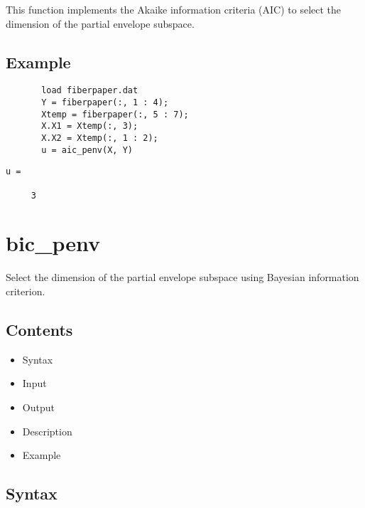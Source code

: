 \documentclass[a4paper,11pt,openany]{memoir}
\begin{document}
\begin{par}
This function implements the Akaike information criteria (AIC) to select the dimension of the partial envelope subspace.
\end{par} \vspace{1em}


\subsection*{Example}


\begin{verbatim}       load fiberpaper.dat
       Y = fiberpaper(:, 1 : 4);
       Xtemp = fiberpaper(:, 5 : 7);
       X.X1 = Xtemp(:, 3);
       X.X2 = Xtemp(:, 1 : 2);
       u = aic_penv(X, Y)\end{verbatim}
    
        \color{lightgray}\ttfamily \begin{verbatim}
u =

     3

\end{verbatim} \rmfamily
\color{black}
    

\newpage

\rmfamily
\color{black}\section{bic\_penv}

\begin{par}
Select the dimension of the partial envelope subspace using Bayesian information criterion.
\end{par} \vspace{1em}

\subsection*{Contents}

\begin{itemize}
\setlength{\itemsep}{-1ex}
   \item Syntax
   \item Input
   \item Output
   \item Description
   \item Example
\end{itemize}


\subsection*{Syntax}
\end{document}
